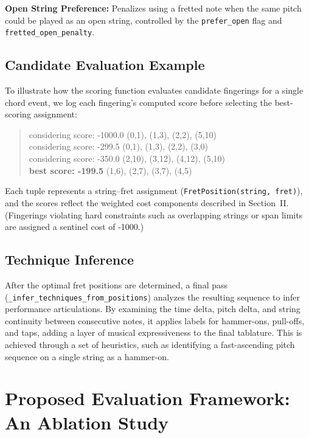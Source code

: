 \documentclass[conference]{IEEEtran}
\begin{document}
\textbf{Open String Preference:} Penalizes using a fretted note when the same pitch could be played as an open string, controlled by the \texttt{prefer\_open} flag and \texttt{fretted\_open\_penalty}.

\subsection{Candidate Evaluation Example}

To illustrate how the scoring function evaluates candidate fingerings for a single chord event, we log each fingering's computed score before selecting the best-scoring assignment:

\begin{quote}\small\ttfamily
considering score: -1000.0 (0,1), (1,3), (2,2), (5,10) \\
considering score: -299.5 (0,1), (1,3), (2,2), (3,0) \\
considering score: -350.0 (2,10), (3,12), (4,12), (5,10) \\
\textbf{best score: -199.5} (1,6), (2,7), (3,7), (4,5)
\end{quote}

Each tuple represents a string–fret assignment (\texttt{FretPosition(string, fret)}), and the scores reflect the weighted cost components described in Section~II. (Fingerings violating hard constraints such as overlapping strings or span limits are assigned a sentinel cost of -1000.)


\subsection{Technique Inference}

After the optimal fret positions are determined, a final pass (\texttt{\_infer\_techniques\_from\_positions}) analyzes the resulting sequence to infer performance articulations. By examining the time delta, pitch delta, and string continuity between consecutive notes, it applies labels for hammer-ons, pull-offs, and taps, adding a layer of musical expressiveness to the final tablature. This is achieved through a set of heuristics, such as identifying a fast-ascending pitch sequence on a single string as a hammer-on.

\section{Proposed Evaluation Framework: An Ablation Study}
\end{document}
